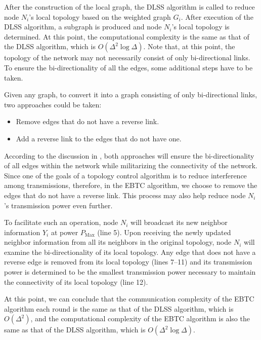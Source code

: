 \documentclass[journal,12pt,onecolumn]{IEEEtran}
\begin{document}
After the construction of the local graph, the DLSS algorithm is
called to reduce node $N_i$'s local topology based on the weighted
graph $G_i$. After execution of the DLSS algorithm, a subgraph is
produced and node $N_i$'s local topology is determined. At this point,
the computational complexity is the same as that of the DLSS
algorithm, which is $O(\Delta^2\log \Delta)$. Note that, at this
point, the topology of the network may not necessarily consist of only
bi-directional links. To ensure the bi-directionality of all the
edges, some additional steps have to be taken.

Given any graph, to convert it into a graph consisting of only
bi-directional links, two approaches could be taken:
\begin{itemize}
\item Remove edges that do not have a reverse link.
\item Add a reverse link to the edges that do not have one.
\end{itemize}
According to the discussion in \cite{LiHou2005-1313}, both approaches
will ensure the bi-directionality of all edges within the
network while militarizing the connectivity of the network. Since one of the goals of a topology control algorithm is to
reduce interference among transmissions, therefore, in the EBTC
algorithm, we choose to remove the edges that do not have a reverse
link. This process may also help reduce node $N_i$'s transmission
power even further.

To facilitate such an operation, node $N_i$ will broadcast
its new neighbor information $Y_i$ at power $P_{\text{Max}}$ (line 5). Upon
receiving the newly updated neighbor information from all its
neighbors in the original topology, node $N_i$ will examine the
bi-directionality of its local topology. Any edge that does not have
a reverse edge is removed from its local topology (lines 7--11) and its
transmission power is determined to be the smallest transmission
power necessary to maintain the connectivity of its local topology
(line 12).

At this point, we can conclude that the communication complexity of
the EBTC algorithm each round is the same as that of the DLSS
algorithm, which is $O(\Delta^2)$, and the computational complexity of
the EBTC algorithm is also the same as that of the DLSS algorithm,
which is $O(\Delta^2\log \Delta)$.
\end{document}
